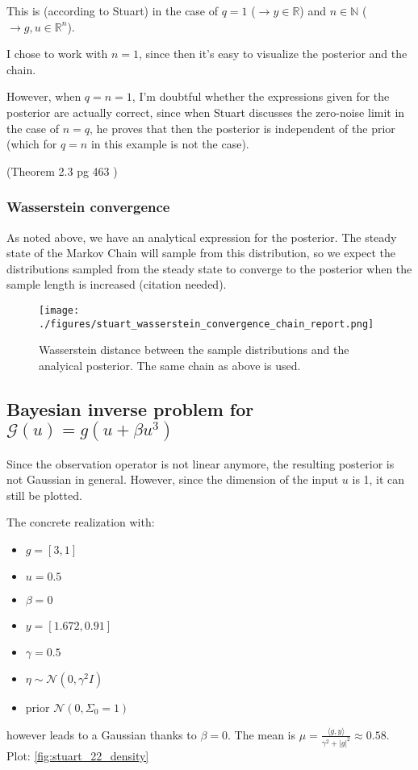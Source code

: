 \documentclass[11pt]{article}
\newcommand{\R}{{\mathbb{R}}}
\newcommand{\NN}{{\mathbb{N}}}
\newcommand{\G}[1]{{\mathcal{G} \left( #1 \right)}}
\newcommand{\N}[2]{\mathcal{N}\left(#1,#2\right)}
\begin{document}
This is (according to Stuart) in the case of \(q = 1\) (\(\to y \in \R\)) and \(n \in \NN\) (\(\to g,u \in \R^n\)).

I chose to work with \(n=1\), since then it's easy to visualize the posterior and the chain.

However, when \(q=n=1\), I'm doubtful whether the expressions given for the posterior are actually
correct, since when Stuart discusses the zero-noise limit in the case of \(n=q\), he proves that
then the posterior is independent of the prior (which for \(q=n\) in this example is not the case).

(Theorem 2.3 pg 463 \cite{stuart_inverse_2010})

\subsubsection{Wasserstein convergence}
\label{sec:org1277536}

As noted above, we have an analytical expression for the posterior. The steady state of the
Markov Chain will sample from this distribution, so we expect the distributions sampled
from the steady state to converge to the posterior 
when the sample length is increased (citation needed).

\begin{figure}[htbp]
\centering
\texttt{[image: ./figures/stuart\_wasserstein\_convergence\_chain\_report.png]}
\caption{\label{fig:stuart_21_convergence}
Wasserstein distance between the sample distributions and the analyical posterior. The same chain as above is used.}
\end{figure}

\subsection{Bayesian inverse problem for \(\G{u} = g (u + \beta u^3)\)}
\label{sec:org2fb38e0}
Since the observation operator is not linear anymore, the resulting posterior is not
Gaussian in general. However, since the dimension of the input \(u\) is 1, it can
still be plotted.

The concrete realization with:
\begin{itemize}
\item \(g = [3, 1]\)
\item \(u = 0.5\)
\item \(\beta = 0\)
\item \(y= [1.672, 0.91]\)
\item \(\gamma = 0.5\)
\item \(\eta \sim \N{0}{\gamma^2 I}\)
\item prior \(\N{0}{\Sigma_0=1}\)
\end{itemize}
however leads to a Gaussian thanks to \(\beta = 0\). The mean is
\(\mu = \frac{\langle g,y \rangle}{\gamma^2 + |g|^2} \approx 0.58\). Plot: \ref{fig:stuart_22_density}
\end{document}
